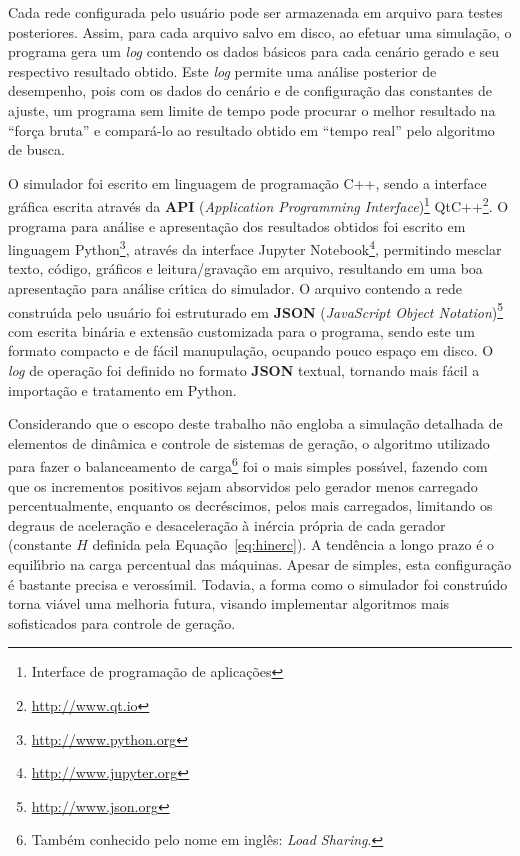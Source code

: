 Cada rede configurada pelo usu{\'a}rio pode ser armazenada em arquivo para testes posteriores. Assim, para cada arquivo salvo em disco, ao efetuar uma simula{\c c}{\~a}o, o programa gera um \textit{log} contendo os dados b{\'a}sicos para cada cen{\'a}rio gerado e seu respectivo resultado obtido. Este \textit{log} permite uma an{\'a}lise posterior de desempenho, pois com os dados do cen{\'a}rio e de configura{\c c}{\~a}o das constantes de ajuste, um programa sem limite de tempo pode procurar o melhor resultado na ``for{\c c}a bruta'' e compar{\'a}-lo ao resultado obtido em ``tempo real'' pelo algoritmo de busca.

O simulador foi escrito em linguagem de programa{\c c}{\~a}o C++, sendo a interface gr{\'a}fica escrita atrav{\'e}s da \textbf{API} (\textit{Application Programming Interface})\footnote{Interface de programa{\c c}{\~a}o de aplica{\c c}{\~o}es} QtC++\footnote{\url{http://www.qt.io}}. O programa para an{\'a}lise e apresenta{\c c}{\~a}o dos resultados obtidos foi escrito em linguagem Python\footnote{\url{http://www.python.org}}, atrav{\'e}s da interface Jupyter Notebook\footnote{\url{http://www.jupyter.org}}, permitindo mesclar texto, c{\'o}digo, gr{\'a}ficos e leitura/grava{\c c}{\~a}o em arquivo, resultando em uma boa apresenta{\c c}{\~a}o para an{\'a}lise cr{\'\i}tica do simulador. O arquivo contendo a rede constru{\'\i}da pelo usu{\'a}rio foi estruturado em \textbf{JSON} (\textit{JavaScript Object Notation})\footnote{\url{http://www.json.org}} com escrita bin{\'a}ria e extens{\~a}o customizada para o programa, sendo este um formato compacto e de f{\'a}cil manupula{\c c}{\~a}o, ocupando pouco espa{\c c}o em disco. O \textit{log} de opera{\c c}{\~a}o foi definido no formato \textbf{JSON} textual, tornando mais f{\'a}cil a importa{\c c}{\~a}o e tratamento em Python.

Considerando que o escopo deste trabalho n{\~a}o engloba a simula{\c c}{\~a}o detalhada de elementos de din{\^a}mica e controle de sistemas de gera{\c c}{\~a}o, o algoritmo utilizado para fazer o balanceamento de carga\footnote{Tamb{\'e}m conhecido pelo nome em ingl{\^e}s: \textit{Load Sharing}.} foi o mais simples poss{\'\i}vel, fazendo com que os incrementos positivos sejam absorvidos pelo gerador menos carregado percentualmente, enquanto os decr{\'e}scimos, pelos mais carregados, limitando os degraus de acelera{\c c}{\~a}o e desacelera{\c c}{\~a}o {\`a} in{\'e}rcia pr{\'o}pria de cada gerador (constante $H$ definida pela Equa{\c c}{\~a}o~\ref{eq:hinerc}). A tend{\^e}ncia a longo prazo {\'e} o equil{\'\i}brio na carga percentual das m{\'a}quinas. Apesar de simples, esta configura{\c c}{\~a}o {\'e} bastante precisa e veross{\'\i}mil. Todavia, a forma como o simulador foi constru{\'\i}do torna vi{\'a}vel uma melhoria futura, visando implementar algoritmos mais sofisticados para controle de gera{\c c}{\~a}o.

